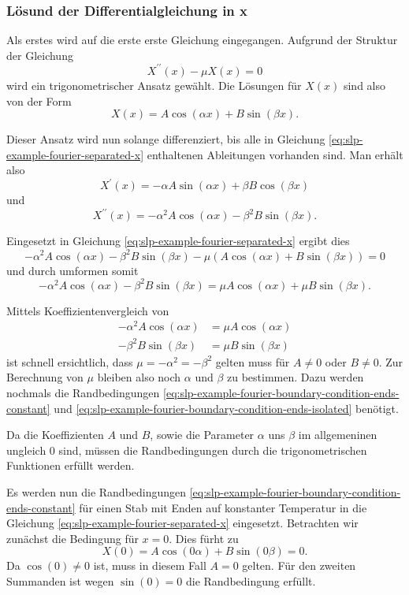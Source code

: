 %
%

\subsubsection{Lösund der Differentialgleichung in x}
Als erstes wird auf die erste erste Gleichung eingegangen.
Aufgrund der Struktur der Gleichung
\[
    X^{\prime \prime}(x) - \mu X(x)
    =
    0
\]
wird ein trigonometrischer Ansatz gewählt.
Die Lösungen für $X(x)$ sind also von der Form
\[
    X(x)
    =
    A \cos \left( \alpha x\right) + B \sin \left( \beta x\right).
\]

Dieser Ansatz wird nun solange differenziert, bis alle in Gleichung 
\eqref{eq:slp-example-fourier-separated-x} enthaltenen Ableitungen vorhanden
sind.
Man erhält also
\[
    X^{\prime}(x)
    =
    - \alpha A \sin \left( \alpha x \right) +
    \beta B \cos \left( \beta x \right)
\]
und
\[
    X^{\prime \prime}(x)
    =
    -\alpha^{2} A \cos \left( \alpha x \right) -
    \beta^{2} B \sin \left( \beta x \right).
\]

Eingesetzt in Gleichung \eqref{eq:slp-example-fourier-separated-x} ergibt dies
\[
    -\alpha^{2}A\cos(\alpha x) - \beta^{2}B\sin(\beta x) -
    \mu\left(A\cos(\alpha x) + B\sin(\beta x)\right)
    =
    0
\]
und durch umformen somit
\[
    -\alpha^{2}A\cos(\alpha x) - \beta^{2}B\sin(\beta x)
    =
    \mu A\cos(\alpha x) + \mu B\sin(\beta x).
\]

Mittels Koeffizientenvergleich von
\[
\begin{aligned}
    -\alpha^{2}A\cos(\alpha x)
    &=
    \mu A\cos(\alpha x)
    \\
    -\beta^{2}B\sin(\beta x)
    &=
    \mu B\sin(\beta x)
\end{aligned}
\]
ist schnell ersichtlich, dass $ \mu = -\alpha^{2} = -\beta^{2} $ gelten muss für
$ A \neq 0 $ oder $ B \neq 0 $.
Zur Berechnung von $ \mu $ bleiben also noch  $ \alpha $ und $ \beta $ zu
bestimmen.
Dazu werden nochmals die Randbedingungen
\eqref{eq:slp-example-fourier-boundary-condition-ends-constant} und
\eqref{eq:slp-example-fourier-boundary-condition-ends-isolated} benötigt.

Da die Koeffizienten $A$ und $B$, sowie die Parameter $\alpha$ uns $\beta$ im
allgemeninen ungleich $0$ sind, müssen die Randbedingungen durch die
trigonometrischen Funktionen erfüllt werden.

Es werden nun die Randbedingungen
\eqref{eq:slp-example-fourier-boundary-condition-ends-constant} für einen Stab
mit Enden auf konstanter Temperatur in die Gleichung 
\eqref{eq:slp-example-fourier-separated-x} eingesetzt.
Betrachten wir zunächst die Bedingung für $x = 0$.
Dies fürht zu
\[
    X(0)
    =
    A \cos(0 \alpha) + B \sin(0 \beta)
    =
    0.
\]
Da $\cos(0) \neq 0$ ist, muss in diesem Fall $A = 0$ gelten.
Für den zweiten Summanden ist wegen $\sin(0) = 0$ die Randbedingung erfüllt.

